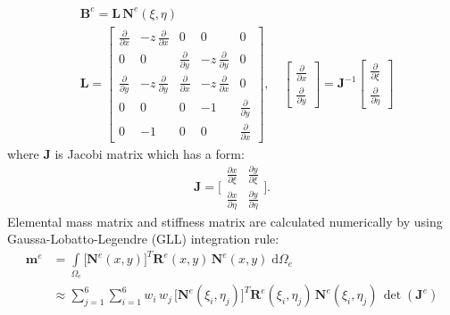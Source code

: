 \documentclass[preprint,12pt]{elsarticle}
\newcommand{\ud}{\mathrm{d}}
\renewcommand{\vec}[1]{\mathbf{#1}}
\renewcommand{\bm}[1]{\mathbf{#1}}
\begin{document}
	\begin{equation}
	\begin{split}
	& \vec{B}^e =  \bm{L} \, \bm{N}^e\!(\xi,\eta) \\ 
	& \bm{L} = \left[\begin{array}{ccccc} \frac{\partial}{\partial x} & -z\, \frac{\partial}{\partial x} & 0 & 0 & 0 \\[4pt]
	0&0&\frac{\partial}{\partial y}&-z\, \frac{\partial}{\partial y}&0\\[4pt]
	\frac{\partial}{\partial y} &-z\,\frac{\partial}{\partial y} & \frac{\partial}{\partial x} &-z\,  \frac{\partial}{\partial x} &0 \\[4pt]
	0&0&0&-1&\frac{\partial}{\partial y} \\[4pt]
	0&-1&0&0&\frac{\partial}{\partial x} \end{array} \right], \quad \left[\begin{array}{c}\frac{\partial }{\partial x}\\[4pt] \frac{\partial }{\partial y}\end{array}\right] = \vec{J}^{-1} \left[\begin{array}{c}\frac{\partial }{\partial \xi}\\[4pt] \frac{\partial }{\partial \eta}\end{array}\right]
	\label{eq:delam_plate_disp_strains}
	\end{split}
	\end{equation} 
	where $\vec{J}$ is Jacobi matrix which has a form:
	\begin{equation}
	\vec{J} = \Bigg[ \begin{array}{cc}\frac{\partial x}{\partial \xi}&\frac{\partial y}{\partial \xi}\\[4pt]
	\frac{\partial x}{\partial \eta}&\frac{\partial y}{\partial \eta}\end{array} \Bigg].
	\label{eq:Jacobi2D}
	\end{equation}
	Elemental mass matrix and stiffness matrix are calculated numerically by using Gaussa-Lobatto-Legendre (GLL) integration rule:
	\begin{equation}
	\begin{split}
	\bm{m}^e &= \int \limits_{\Omega_e} \big[\bm{N}^e\!(x,y)\big]^{\!T} \bm{R}^e\!(x,y) \, \bm{N}^e\!(x,y) \; \ud \Omega_e \\
	&	\approx \sum \limits_{j=1}^{6} \sum \limits_{i=1}^{6} w_i\, w_j \, \big[\bm{N}^e\!(\xi_i, \eta_j)\big]^{\!T} \bm{R}^e\!(\xi_i, \eta_j)	\,
	\bm{N}^e\!(\xi_i,\eta_j) \, \det(\vec{J}^e)\label{eq:delam_plate_mass}
	\end{split}
	\end{equation} 
\end{document}
